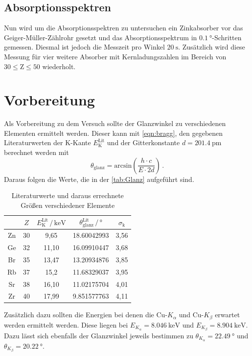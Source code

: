 \subsection{Absorptionsspektren}
Nun wird um die Absorptionsspektren zu untersuchen ein Zinkabsorber vor das Geiger-Müller-Zählrohr gesetzt und das Absorptionsspektrum in $\SI{0.1}{\degree}$-Schritten gemessen. Diesmal ist
jedoch die Messzeit pro Winkel $\SI{20}{\second}$. Zusätzlich wird diese Messung für vier weitere Absorber mit Kernladungszahlen im Bereich von $30 \leq \text{Z} \leq 50$ wiederholt.



\section{Vorbereitung}
Als Vorbereitung zu dem Versuch sollte der Glanzwinkel zu verschiedenen Elementen ermittelt werden. Dieser kann mit \autoref{eqn:bragg}, den gegebenen Literaturwerten der 
K-Kante $E_\text{K}^\text{Lit}$ \cite{wissen} und der Gitterkonstante $d = \SI{201.4}{\pico\meter}$ berechnet werden mit 
\begin{equation}
    \theta_\text{glanz} = \text{arcsin}\left(\frac{h \cdot c}{E \cdot 2d}\right) \, .
    \label{eqn:theta}
\end{equation}
\noindent
Daraus folgen die Werte, die in der \autoref{tab:Glanz} aufgeführt sind. 
\begin{table}
    \centering
    \caption{Literaturwerte und daraus errechnete Größen verschiedener Elemente}
    \label{tab:Glanz}
    \begin{tabular}{c c c c c}
    \toprule
    $ $ & $Z$ & $E_\text{K}^\text{Lit} \,/\, \si{\kilo\eV}$
    & $\theta_\text{glanz}^\text{Lit} \,/\, \si{\degree}$ & 
    $\sigma_\text{k}$\\
    \midrule 
    Zn & 30 &  9,65 & 18.60042993 & 3,56 \\
    Ge & 32 & 11,10 & 16.09910447 & 3,68 \\
    Br & 35 & 13,47 & 13.20934876 & 3,85 \\
    Rb & 37 & 15,2 & 11.68329037 & 3,95 \\
    Sr & 38 & 16,10 & 11.02175704 & 4,01 \\
    Zr & 40 & 17,99 &  9.851577763 & 4,11 \\
    \bottomrule
    \end{tabular}
    \end{table}

\noindent
Zusätzlich dazu sollten die Energien bei denen die Cu-$K_\alpha$ und Cu-$K_\beta$ erwartet werden ermittelt werden. Diese liegen bei $E_{K_\alpha} = \SI{8.046}{\kilo\eV}$ und $E_{K_\beta} = \SI{8.904}{\kilo\eV}$.
Dazu lässt sich ebenfalls der Glanzwinkel jeweils bestimmen zu $\theta_{K_\alpha} = \SI{22.49}{\degree}$ und $\theta_{K_\beta} = \SI{20.22}{\degree}$.
